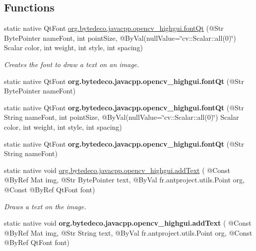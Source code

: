 \subsection*{Functions}
\begin{DoxyCompactItemize}
\item 
static native Qt\+Font \hyperlink{group__highgui__qt_gaee437fe91204f6d6d9016c6a7b78850d}{org.\+bytedeco.\+javacpp.\+opencv\+\_\+highgui.\+font\+Qt} (@Str Byte\+Pointer name\+Font, int point\+Size, @By\+Val(null\+Value=\char`\"{}cv\+::\+Scalar\+::all(0)\char`\"{}) Scalar color, int weight, int style, int spacing)
\begin{DoxyCompactList}\small\item\em Creates the font to draw a text on an image. \end{DoxyCompactList}\item 
\mbox{\label{group__highgui__qt_gaf9e2c05403b923a4906cd83c2051a641}} 
static native Qt\+Font {\bfseries org.\+bytedeco.\+javacpp.\+opencv\+\_\+highgui.\+font\+Qt} (@Str Byte\+Pointer name\+Font)
\item 
\mbox{\label{group__highgui__qt_gaffe37a1adb6064e41ebd583585d32e87}} 
static native Qt\+Font {\bfseries org.\+bytedeco.\+javacpp.\+opencv\+\_\+highgui.\+font\+Qt} (@Str String name\+Font, int point\+Size, @By\+Val(null\+Value=\char`\"{}cv\+::\+Scalar\+::all(0)\char`\"{}) Scalar color, int weight, int style, int spacing)
\item 
\mbox{\label{group__highgui__qt_ga83777e04ba7f2e58cf5dd46e998fc020}} 
static native Qt\+Font {\bfseries org.\+bytedeco.\+javacpp.\+opencv\+\_\+highgui.\+font\+Qt} (@Str String name\+Font)
\item 
static native void \hyperlink{group__highgui__qt_gaccc5f5d89abe18bc7adfd650dccb265f}{org.\+bytedeco.\+javacpp.\+opencv\+\_\+highgui.\+add\+Text} ( @Const @By\+Ref Mat img, @Str Byte\+Pointer text, @By\+Val fr.antproject.utils.Point org, @Const @By\+Ref Qt\+Font font)
\begin{DoxyCompactList}\small\item\em Draws a text on the image. \end{DoxyCompactList}\item 
\mbox{\label{group__highgui__qt_ga0722ac34d2ff69c3ccca326f56090870}} 
static native void {\bfseries org.\+bytedeco.\+javacpp.\+opencv\+\_\+highgui.\+add\+Text} ( @Const @By\+Ref Mat img, @Str String text, @By\+Val fr.antproject.utils.Point org, @Const @By\+Ref Qt\+Font font)

\end{DoxyCompactItemize}
